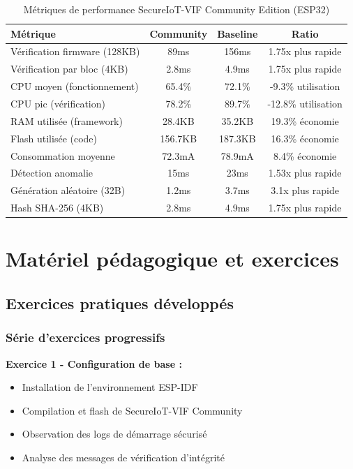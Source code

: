 \begin{table}[h]
\centering
\caption{Métriques de performance SecureIoT-VIF Community Edition (ESP32)}
\label{tab:community-performance-metrics}
\begin{tabular}{|l|c|c|c|}
\hline
\textbf{Métrique} & \textbf{Community} & \textbf{Baseline} & \textbf{Ratio} \\
\hline
Vérification firmware (128KB) & 89ms & 156ms & 1.75x plus rapide \\
Vérification par bloc (4KB) & 2.8ms & 4.9ms & 1.75x plus rapide \\
CPU moyen (fonctionnement) & 65.4\% & 72.1\% & -9.3\% utilisation \\
CPU pic (vérification) & 78.2\% & 89.7\% & -12.8\% utilisation \\
RAM utilisée (framework) & 28.4KB & 35.2KB & 19.3\% économie \\
Flash utilisée (code) & 156.7KB & 187.3KB & 16.3\% économie \\
Consommation moyenne & 72.3mA & 78.9mA & 8.4\% économie \\
Détection anomalie & 15ms & 23ms & 1.53x plus rapide \\
Génération aléatoire (32B) & 1.2ms & 3.7ms & 3.1x plus rapide \\
Hash SHA-256 (4KB) & 2.8ms & 4.9ms & 1.75x plus rapide \\
\hline
\end{tabular}
\end{table}

\section{Matériel pédagogique et exercices}

\subsection{Exercices pratiques développés}

\subsubsection{Série d'exercices progressifs}

\textbf{Exercice 1 - Configuration de base :}
\begin{itemize}
    \item Installation de l'environnement ESP-IDF
    \item Compilation et flash de SecureIoT-VIF Community
    \item Observation des logs de démarrage sécurisé
    \item Analyse des messages de vérification d'intégrité
\end{itemize}

